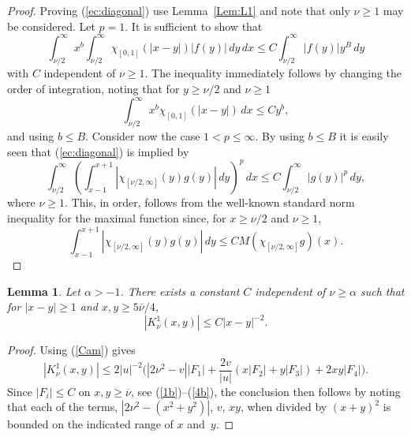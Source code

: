 \documentclass[leqno,a4paper]{amsart}
\newtheorem{Lem}{Lemma}
\newcommand{\overnu}{\overline{\nu}}
\begin{document}
\begin{proof}
Proving (\ref{ec:diagonal}) use Lemma~\ref{Lem:L1} and note that only
$\nu\ge1$ may be considered. Let $p=1$.
It is sufficient to show that
\begin{equation*}
\int_{\nu/2}^{\infty}x^{b}\int_{\nu/2}^{\infty}\chi_{[0,1]}(|x-y|)|f(y)|\,dy
\,dx\le C \int_{\nu/2}^{\infty}\left|f(y)\right|y^B\,dy
\end{equation*}
with $C$ independent of $\nu\ge1$.
The inequality immediately follows by changing the order of integration,
noting that for $y\ge\nu/2$ and $\nu\ge1$
\begin{equation*}
\int_{\nu/2}^{\infty}x^{b}\chi_{[0,1]}(|x-y|)\,dx
\le Cy^b,
\end{equation*}
and using $b\le B$. Consider now the case $1<p\le\infty$. By using
$b\le B$ it is easily seen that (\ref{ec:diagonal}) is implied by
\begin{equation*}
\int_{\nu/2}^{\infty}\left(\int_{x-1}^{x+1}|
\chi_{[\nu/2,\infty]}(y)g(y)|\,dy\right)^p\,dx
\le C \int_{\nu/2}^{\infty}\left|g(y)\right|^p\,dy,
\end{equation*}
where $\nu\ge1$.
This, in order, follows from the well-known standard norm inequality for the
maximal function since, for $x\ge\nu/2$ and $\nu\ge1$,
\begin{equation*}
\int_{x-1}^{x+1}|\chi_{[\nu/2,\infty]}(y)g(y)|\,dy
\le C M(\chi_{[\nu/2,\infty]}g)(x).
\end{equation*}
\end{proof}

\begin{Lem}
\label{Lem:L2} Let $\alpha>-1$. There exists a constant $C$
independent of $\nu\ge\alpha$ such that for $|x-y|\ge1$ and
$x,y\ge 5\overnu/4$,
\begin{equation}
\label{ec:cota2nu}
|K^1_\nu(x,y)|\le C |x-y|^{-2}.
\end{equation}
\end{Lem}

\begin{proof}
Using (\ref{Cam}) gives
\begin{equation}
\label{ec:jk}
|K^1_\nu(x,y)|\le 2 |u|^{-2}\bigg(|2\nu^2-v||F_1|+\frac{2v}{|u|}
(x|F_2|+y|F_3|)+2xy|F_4|\bigg).
\end{equation}
Since $|F_i|\le C$ on $x,y\ge\overnu$, see (\ref{1b})--(\ref{4b}),
the conclusion then follows by noting that each of the terms,
$|2\nu^2-(x^2+y^2)|$, $v$, $xy$, when
divided by $(x+y)^{2}$ is bounded on the indicated range of $x$ and~$y$.
\end{proof}
\end{document}
